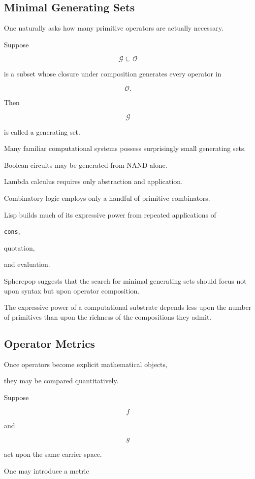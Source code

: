 \documentclass[12pt,oneside]{article}
\begin{document}
\subsection{Minimal Generating Sets}

One naturally asks how many primitive operators are actually necessary.

Suppose

\[
\mathcal G
\subseteq
\mathcal O
\]

is a subset whose closure under composition generates every operator in

\[
\mathcal O.
\]

Then

\[
\mathcal G
\]

is called a generating set.

Many familiar computational systems possess surprisingly small generating sets.

Boolean circuits may be generated from NAND alone.

Lambda calculus requires only abstraction and application.

Combinatory logic employs only a handful of primitive combinators.

Lisp builds much of its expressive power from repeated applications of

\texttt{cons},

quotation,

and evaluation.

Spherepop suggests that the search for minimal generating sets should focus not upon syntax but upon operator composition.

The expressive power of a computational substrate depends less upon the number of primitives than upon the richness of the compositions they admit.

\subsection{Operator Metrics}

Once operators become explicit mathematical objects,

they may be compared quantitatively.

Suppose

\[
f
\]

and

\[
g
\]

act upon the same carrier space.

One may introduce a metric
\end{document}
